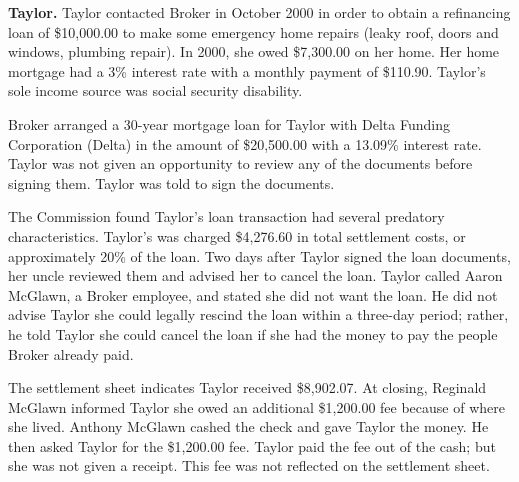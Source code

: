 \textbf{Taylor.} Taylor contacted Broker in October 2000 in order to obtain a
refinancing loan of \$10,000.00 to make some emergency home repairs (leaky
roof, doors and windows, plumbing repair). In 2000, she owed \$7,300.00 on her
home. Her home mortgage had a 3\% interest rate with a monthly payment of
\$110.90. Taylor's sole income source was social security disability. 

Broker arranged a 30-year mortgage loan for Taylor with Delta Funding
Corporation (Delta) in the amount of \$20,500.00 with a 13.09\% interest rate.
Taylor was not given an opportunity to review any of the documents before
signing them. Taylor was told to sign the documents. 

The Commission found Taylor's loan transaction had several predatory
characteristics. Taylor's was charged \$4,276.60 in total settlement costs, or
approximately 20\% of the loan. Two days after Taylor signed the loan
documents, her uncle reviewed them and advised her to cancel the loan. Taylor
called Aaron McGlawn, a Broker employee, and stated she did not want the loan.
He did not advise Taylor she could legally rescind the loan within a three-day
period; rather, he told Taylor she could cancel the loan if she had the money
to pay the people Broker already paid. 

The settlement sheet indicates Taylor received \$8,902.07. At closing, Reginald
McGlawn informed Taylor she owed an additional \$1,200.00 fee because of where
she lived. Anthony McGlawn cashed the check and gave Taylor the money. He then
asked Taylor for the \$1,200.00 fee. Taylor paid the fee out of the cash; but
she was not given a receipt. This fee was not reflected on the settlement
sheet. 

